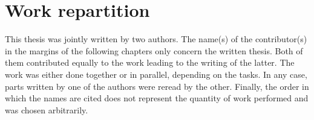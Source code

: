 \section{Work repartition}

This thesis was jointly written by two authors. The name(s) of the contributor(s) in the margins of the following chapters only concern the written thesis. Both of them contributed equally to the work leading to the writing of the latter. The work was either done together or in parallel, depending on the tasks. In any case, parts written by one of the authors were reread by the other. Finally, the order in which the names are cited does not represent the quantity of work performed and was chosen arbitrarily. 